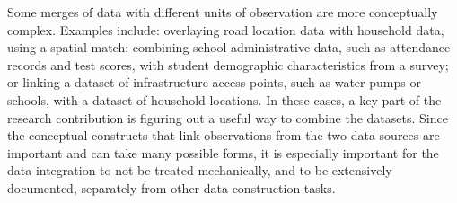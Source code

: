 \documentclass[
]{book}
\begin{document}
Some merges of data with different units of observation
are more conceptually complex.
Examples include: overlaying road location data with household data,
using a spatial match; combining school administrative data, such as attendance records and test scores,
with student demographic characteristics from a survey;
or linking a dataset of infrastructure access points, such as water pumps or schools,
with a dataset of household locations.
In these cases, a key part of the research contribution is figuring out
a useful way to combine the datasets.
Since the conceptual constructs that link observations from the two data sources
are important and can take many possible forms,
it is especially important for the data integration to not be treated mechanically,
and to be extensively documented, separately from other data construction tasks.
\end{document}
